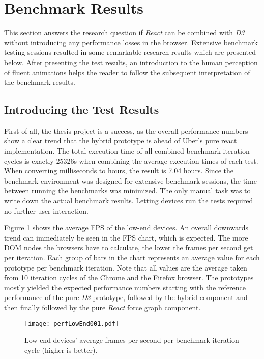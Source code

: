 \section{Benchmark Results}

This section answers the research question if \emph{React} can be combined with \emph{D3} without introducing any performance losses in the browser. Extensive benchmark testing sessions resulted in some remarkable research results which are presented below. After presenting the test results, an introduction to the human perception of fluent animations helps the reader to follow the subsequent interpretation of the benchmark results.

\subsection{Introducing the Test Results}

First of all, the thesis project is a success, as the overall performance numbers show a clear trend that the hybrid prototype is ahead of Uber's pure react implementation. The total execution time of all combined benchmark iteration cycles is exactly 25326s when combining the average execution times of each test. When converting milliseconds to hours, the result is 7.04 hours. Since the benchmark environment was designed for extensive benchmark sessions, the time between running the benchmarks was minimized. The only manual task was to write down the actual benchmark results. Letting devices run the tests required no further user interaction. 

Figure \ref{fig:perfLowEnd001} shows the average FPS of the low-end devices. An overall downwards trend can immediately be seen in the FPS chart, which is expected. The more DOM nodes the browsers have to calculate, the lower the frames per second get per iteration. Each group of bars in the chart represents an average value for each prototype per benchmark iteration. Note that all values are the average taken from 10 iteration cycles of the Chrome and the Firefox browser. The prototypes mostly yielded the expected performance numbers starting with the reference performance of the pure \emph{D3} prototype, followed by the hybrid component and then finally followed by the pure \emph{React} force graph component.

\begin{figure}
\centering
\texttt{[image: perfLowEnd001.pdf]}
\caption{Low-end devices' average frames per second per benchmark iteration cycle (higher is better).}
\label{fig:perfLowEnd001}
\end{figure}

